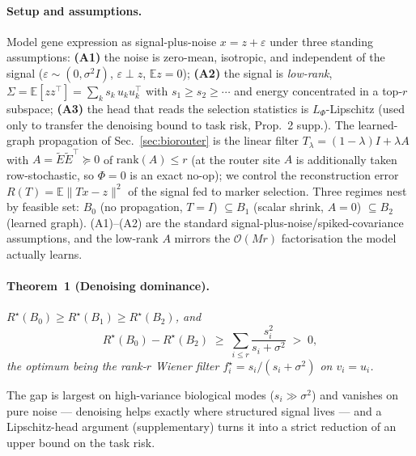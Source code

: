 \documentclass[letterpaper]{article}
\begin{document}
\paragraph{Setup and assumptions.}
Model gene expression as signal-plus-noise $x=z+\varepsilon$ under three standing assumptions:
\textbf{(A1)} the noise is zero-mean, isotropic, and independent of the signal
($\varepsilon\sim(0,\sigma^2 I)$, $\varepsilon\perp z$, $\mathbb{E}z=0$); \textbf{(A2)} the signal
is \emph{low-rank}, $\Sigma=\mathbb{E}[zz^\top]=\sum_k s_k\,u_k u_k^\top$ with $s_1\ge s_2\ge\cdots$
and energy concentrated in a top-$r$ subspace; \textbf{(A3)} the head that reads the selection
statistics is $L_\Phi$-Lipschitz (used only to transfer the denoising bound to task risk,
Prop.~2 supp.). The learned-graph propagation of Sec.~\ref{sec:biorouter} is the linear filter
$T_\lambda=(1-\lambda)I+\lambda A$ with $A=\tilde E\tilde E^\top\succeq0$ of $\mathrm{rank}(A)\le r$
(at the router site $A$ is additionally taken row-stochastic, so $\Phi{=}0$ is an exact no-op);
we control the reconstruction error $R(T)=\mathbb{E}\lVert Tx-z\rVert^2$ of the signal fed to
marker selection. Three regimes nest by feasible set: $B_0$ (no propagation, $T{=}I$)
$\subseteq B_1$ (scalar shrink, $A{=}0$) $\subseteq B_2$ (learned graph). (A1)--(A2) are the standard
signal-plus-noise/spiked-covariance assumptions, and the low-rank $A$ mirrors the $\mathcal{O}(Mr)$
factorisation the model actually learns.

\paragraph{Theorem~1 (Denoising dominance).}
\emph{$R^\star(B_0)\ge R^\star(B_1)\ge R^\star(B_2)$, and}
\begin{equation*}
R^\star(B_0)-R^\star(B_2)\;\ge\;\sum_{i\le r}\frac{s_i^2}{s_i+\sigma^2}\;>\;0,
\end{equation*}
\emph{the optimum being the rank-$r$ Wiener filter $f_i^\star=s_i/(s_i+\sigma^2)$ on $v_i=u_i$.}

The gap is largest on high-variance biological modes ($s_i\gg\sigma^2$) and vanishes on pure
noise --- denoising helps exactly where structured signal lives --- and a Lipschitz-head
argument (supplementary) turns it into a strict reduction of an upper bound on the task risk.
\end{document}

